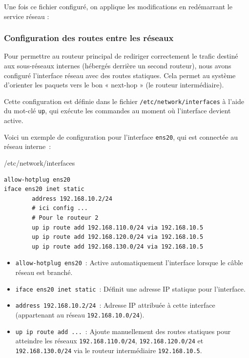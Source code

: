 \documentclass{article}
\begin{document}
Une fois ce fichier configuré, on applique les modifications en redémarrant le service réseau :


\subsubsection{Configuration des routes entre les réseaux}

Pour permettre au routeur principal de rediriger correctement le trafic destiné aux sous-réseaux internes (hébergés derrière un second routeur), nous avons configuré l’interface réseau avec des routes statiques. Cela permet au système d’orienter les paquets vers le bon « next-hop » (le routeur intermédiaire).

Cette configuration est définie dans le fichier \texttt{/etc/network/interfaces} à l’aide du mot-clé \texttt{up}, qui exécute les commandes au moment où l’interface devient active.

Voici un exemple de configuration pour l’interface \texttt{ens20}, qui est connectée au réseau interne~:

\begin{configbox}{/etc/network/interfaces}
\begin{lstlisting}
allow-hotplug ens20
iface ens20 inet static
        address 192.168.10.2/24
        # ici config ...
        # Pour le routeur 2
        up ip route add 192.168.110.0/24 via 192.168.10.5
        up ip route add 192.168.120.0/24 via 192.168.10.5
        up ip route add 192.168.130.0/24 via 192.168.10.5
\end{lstlisting}
\end{configbox}

\begin{itemize}
  \item \texttt{allow-hotplug ens20}~: Active automatiquement l'interface lorsque le câble réseau est branché.
  \item \texttt{iface ens20 inet static}~: Définit une adresse IP statique pour l'interface.
  \item \texttt{address 192.168.10.2/24}~: Adresse IP attribuée à cette interface (appartenant au réseau \texttt{192.168.10.0/24}).
  \item \texttt{up ip route add ...}~: Ajoute manuellement des routes statiques pour atteindre les réseaux \texttt{192.168.110.0/24}, \texttt{192.168.120.0/24} et \texttt{192.168.130.0/24} via le routeur intermédiaire \texttt{192.168.10.5}.
\end{itemize}
\end{document}
